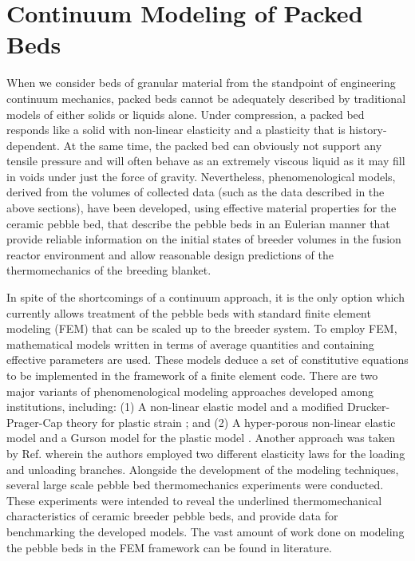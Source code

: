 \documentclass[11pt]{report} %
\begin{document}
\FloatBarrier
\section{Continuum Modeling of Packed Beds}
When we consider beds of granular material from the standpoint of engineering continuum mechanics, packed beds cannot be adequately described by traditional models of either solids or liquids alone. Under compression, a packed bed responds like a solid with non-linear elasticity and a plasticity that is history-dependent. At the same time, the packed bed can obviously not support any tensile pressure and will often behave as an extremely viscous liquid as it may fill in voids under just the force of gravity. Nevertheless, phenomenological models, derived from the volumes of collected data (such as the data described in the above sections), have been developed, using effective material properties for the ceramic pebble bed, that describe the pebble beds in an Eulerian manner that provide reliable information on the initial states of breeder volumes in the fusion reactor environment and allow reasonable design predictions of the thermomechanics of the breeding blanket. 

In spite of the shortcomings of a continuum approach, it is the only option which currently allows treatment of the pebble beds with standard finite element modeling (FEM) that can be scaled up to the breeder system. To employ FEM, mathematical models written in terms of average quantities and containing effective parameters are used. These models deduce a set of constitutive equations to be implemented in the framework of a finite element code.  There are two major variants of phenomenological modeling approaches developed among institutions, including: (1) A non-linear elastic model and a modified Drucker-Prager-Cap theory for plastic strain \cite{Gan2007189,Fokkens2003}; and (2) A hyper-porous non-linear elastic model and a Gurson model for the plastic model \cite{DellOrco:2007hc,DellOrco:2010zr,DiMaio20081287}. Another approach was taken by Ref.\cite{Fokkens2003} wherein the authors employed two different elasticity laws for the loading and unloading branches. Alongside the development of the modeling techniques, several large scale pebble bed thermomechanics experiments were conducted. These experiments were intended to reveal the underlined thermomechanical characteristics of ceramic breeder pebble beds, and provide data for benchmarking the developed models. The vast amount of work done on modeling the pebble beds in the FEM framework can be found in literature. \cite{DellOrco:2007hc,DellOrco:2010zr,DiMaio20101234,Gan:2009vn,Gan:2010lh,Gan:2010kc,Gan2007189} 
\end{document}
